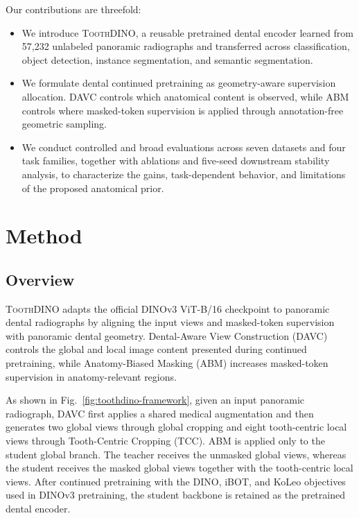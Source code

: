 \documentclass[conference]{IEEEtran}
\newcommand{\ToothDINO}{\textsc{ToothDINO}}
\newcommand{\DAVC}{\textsc{DAVC}}
\newcommand{\TCC}{\textsc{TCC}}
\newcommand{\ABM}{\textsc{ABM}}
\begin{document}
Our contributions are threefold:
\begin{itemize}
\item We introduce \ToothDINO{}, a reusable pretrained dental encoder learned from 57,232 unlabeled panoramic radiographs and transferred across classification, object detection, instance segmentation, and semantic segmentation.

\item We formulate dental continued pretraining as geometry-aware supervision allocation. \DAVC{} controls which anatomical content is observed, while \ABM{} controls where masked-token supervision is applied through annotation-free geometric sampling.

\item We conduct controlled and broad evaluations across seven datasets and four task families, together with ablations and five-seed downstream stability analysis, to characterize the gains, task-dependent behavior, and limitations of the proposed anatomical prior.
\end{itemize}


\section{Method}
\label{sec:method}

\subsection{Overview}

\ToothDINO{} adapts the official DINOv3 ViT-B/16 checkpoint to panoramic dental radiographs by aligning the input views and masked-token supervision with panoramic dental geometry. Dental-Aware View Construction (\DAVC{}) controls the global and local image content presented during continued pretraining, while Anatomy-Biased Masking (\ABM{}) increases masked-token supervision in anatomy-relevant regions.

As shown in Fig.~\ref{fig:toothdino-framework}, given an input panoramic radiograph, \DAVC{} first applies a shared medical augmentation and then generates two global views through global cropping and eight tooth-centric local views through Tooth-Centric Cropping (\TCC{}). \ABM{} is applied only to the student global branch. The teacher receives the unmasked global views, whereas the student receives the masked global views together with the tooth-centric local views. After continued pretraining with the DINO, iBOT, and KoLeo objectives used in DINOv3 pretraining, the student backbone is retained as the pretrained dental encoder.
\end{document}
